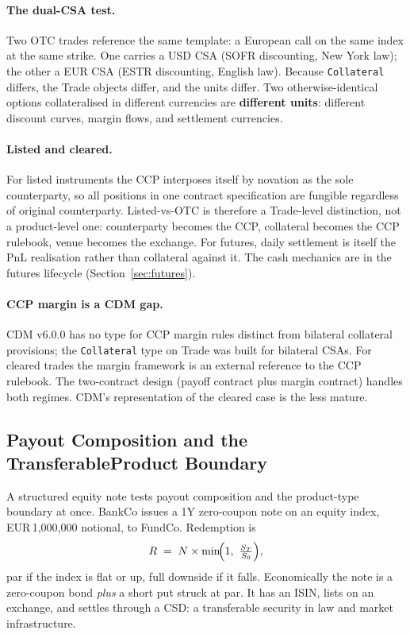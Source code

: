 \paragraph{The dual-CSA test.} Two OTC trades reference the same template: a European call on the same index at the same strike. One carries a USD CSA (SOFR discounting, New York law); the other a EUR CSA (ESTR discounting, English law). Because \texttt{Collateral} differs, the Trade objects differ, and the units differ. Two otherwise-identical options collateralised in different currencies are \textbf{different units}: different discount curves, margin flows, and settlement currencies.

\paragraph{Listed and cleared.} For listed instruments the CCP interposes itself by novation as the sole counterparty, so all positions in one contract specification are fungible regardless of original counterparty. Listed-vs-OTC is therefore a Trade-level distinction, not a product-level one: counterparty becomes the CCP, collateral becomes the CCP rulebook, venue becomes the exchange. For futures, daily settlement is itself the PnL realisation rather than collateral against it. The cash mechanics are in the futures lifecycle (Section~\ref{sec:futures}).

\paragraph{CCP margin is a CDM gap.} CDM v6.0.0 has no type for CCP margin rules distinct from bilateral collateral provisions; the \texttt{Collateral} type on Trade was built for bilateral CSAs. For cleared trades the margin framework is an external reference to the CCP rulebook. The two-contract design (payoff contract plus margin contract) handles both regimes. CDM's representation of the cleared case is the less mature.

\subsection{Payout Composition and the TransferableProduct Boundary}
\label{sec:cdm-structured-note}

A structured equity note tests payout composition and the product-type boundary at once. BankCo issues a 1Y zero-coupon note on an equity index, EUR\,1{,}000{,}000 notional, to FundCo. Redemption is
\[
R \;=\; N \times \min\!\Bigl(1,\ \tfrac{S_T}{S_0}\Bigr),
\]
par if the index is flat or up, full downside if it falls. Economically the note is a zero-coupon bond \emph{plus} a short put struck at par. It has an ISIN, lists on an exchange, and settles through a CSD: a transferable security in law and market infrastructure.

